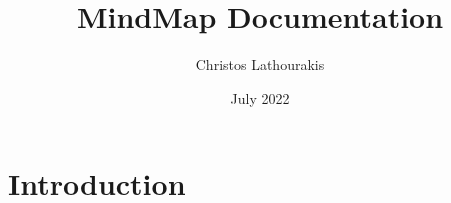 \documentclass{article}
\title{MindMap Documentation}
\author{Christos Lathourakis}
\date{July 2022}
\begin{document}
\maketitle

\section{Introduction}
\end{document}
